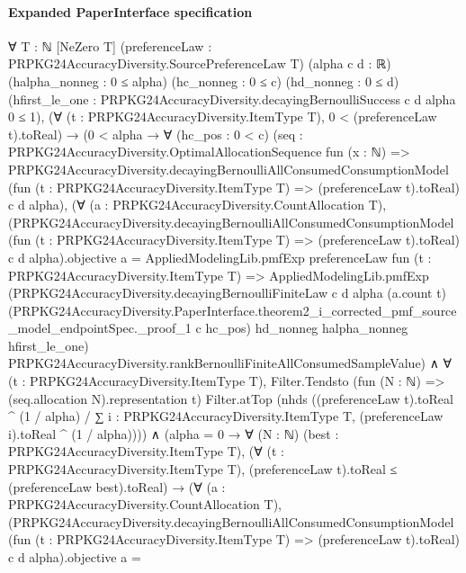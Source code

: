 \documentclass[10pt]{article}
\begin{document}
\paragraph{Expanded PaperInterface specification}
\begin{ReviewVerbatim}
∀ {T : ℕ} [NeZero T] (preferenceLaw : PRPKG24AccuracyDiversity.SourcePreferenceLaw T) (alpha c d : ℝ)
  (halpha_nonneg : 0 ≤ alpha) (hc_nonneg : 0 ≤ c) (hd_nonneg : 0 ≤ d)
  (hfirst_le_one : PRPKG24AccuracyDiversity.decayingBernoulliSuccess c d alpha 0 ≤ 1),
  (∀ (t : PRPKG24AccuracyDiversity.ItemType T), 0 < (preferenceLaw t).toReal) →
    (0 < alpha →
        ∀ (hc_pos : 0 < c)
          (seq :
            PRPKG24AccuracyDiversity.OptimalAllocationSequence fun (x : ℕ) =>
              PRPKG24AccuracyDiversity.decayingBernoulliAllConsumedConsumptionModel
                (fun (t : PRPKG24AccuracyDiversity.ItemType T) => (preferenceLaw t).toReal) c d alpha),
          (∀ (a : PRPKG24AccuracyDiversity.CountAllocation T),
              (PRPKG24AccuracyDiversity.decayingBernoulliAllConsumedConsumptionModel
                      (fun (t : PRPKG24AccuracyDiversity.ItemType T) => (preferenceLaw t).toReal) c d alpha).objective
                  a =
                AppliedModelingLib.pmfExp preferenceLaw fun (t : PRPKG24AccuracyDiversity.ItemType T) =>
                  AppliedModelingLib.pmfExp
                    (PRPKG24AccuracyDiversity.decayingBernoulliFiniteLaw c d alpha (a.count t)
                      (PRPKG24AccuracyDiversity.PaperInterface.theorem2_i_corrected_pmf_source_model_endpointSpec._proof_1
                        c hc_pos)
                      hd_nonneg halpha_nonneg hfirst_le_one)
                    PRPKG24AccuracyDiversity.rankBernoulliFiniteAllConsumedSampleValue) ∧
            ∀ (t : PRPKG24AccuracyDiversity.ItemType T),
              Filter.Tendsto (fun (N : ℕ) => (seq.allocation N).representation t) Filter.atTop
                (nhds
                  ((preferenceLaw t).toReal ^ (1 / alpha) /
                    ∑ i : PRPKG24AccuracyDiversity.ItemType T, (preferenceLaw i).toReal ^ (1 / alpha)))) ∧
      (alpha = 0 →
        ∀ (N : ℕ) (best : PRPKG24AccuracyDiversity.ItemType T),
          (∀ (t : PRPKG24AccuracyDiversity.ItemType T), (preferenceLaw t).toReal ≤ (preferenceLaw best).toReal) →
            (∀ (a : PRPKG24AccuracyDiversity.CountAllocation T),
                (PRPKG24AccuracyDiversity.decayingBernoulliAllConsumedConsumptionModel
                        (fun (t : PRPKG24AccuracyDiversity.ItemType T) => (preferenceLaw t).toReal) c d alpha).objective
                    a =

\end{ReviewVerbatim}
\end{document}
